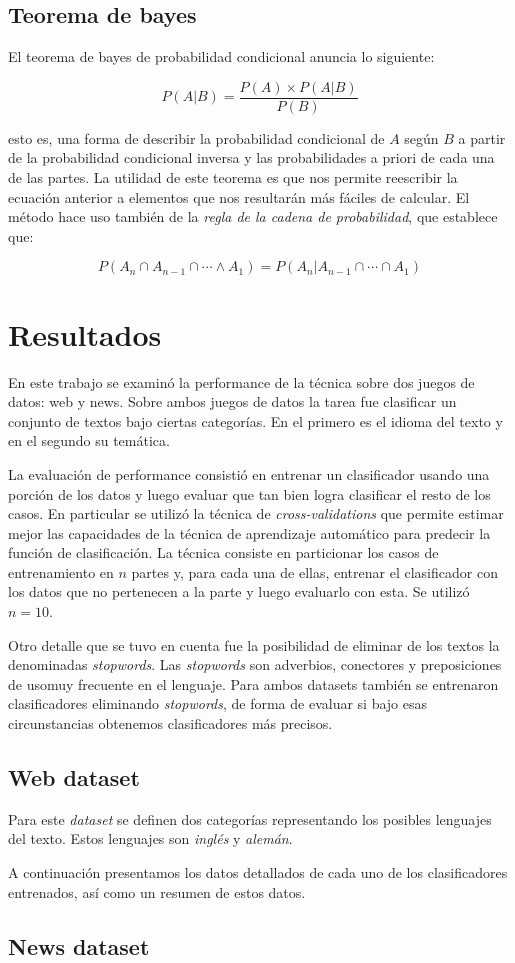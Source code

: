 \documentclass[a4paper,10pt]{article}
\begin{document}
\subsection{Teorema de bayes}

El teorema de bayes de probabilidad condicional anuncia lo siguiente:

$$ P(A | B) = \frac{P(A) \times P(A | B)}{P(B)} $$

esto es, una forma de describir la probabilidad condicional de $A$ según $B$ a partir de la probabilidad condicional inversa y las probabilidades a priori de cada una de las partes. La utilidad de este teorema es que nos permite reescribir la ecuación anterior a elementos que nos resultarán más fáciles de calcular. El método hace uso también de la \emph{regla de la cadena de probabilidad}, que establece que:

$$ P(A_n \cap A_{n-1} \cap \cdots \land A_1) = P(A_n | A_{n-1} \cap \cdots \cap A_1) $$

\section{Resultados}

En este trabajo se examinó la performance de la técnica sobre dos juegos de datos: \textsf{web} y \textsf{news}. Sobre ambos juegos de datos la tarea fue clasificar un conjunto de textos bajo ciertas categorías. En el primero es el idioma del texto y en el segundo su temática. 

La evaluación de performance consistió en entrenar un clasificador usando una porción de los datos y luego evaluar que tan bien logra clasificar el resto de los casos. En particular se utilizó la técnica de \emph{cross-validations} que permite estimar mejor las capacidades de la técnica de aprendizaje automático para predecir la función de clasificación. La técnica consiste en particionar los casos de entrenamiento en $n$ partes y, para cada una de ellas, entrenar el clasificador con los datos que no pertenecen a la parte y luego evaluarlo con esta. Se utilizó $n = 10$.

Otro detalle que se tuvo en cuenta fue la posibilidad de eliminar de los textos la denominadas \emph{stopwords}. Las \emph{stopwords} son adverbios, conectores y preposiciones de usomuy frecuente en el lenguaje. Para ambos datasets también se entrenaron clasificadores eliminando \emph{stopwords}, de forma de evaluar si bajo esas circunstancias obtenemos clasificadores más precisos.

\subsection{\textsf{Web} dataset}

Para este \emph{dataset} se definen dos categorías representando los posibles lenguajes del texto. Estos lenguajes son \emph{inglés} y \emph{alemán}.

A continuación presentamos los datos detallados de cada uno de los clasificadores entrenados, así como un resumen de estos datos.

\subsection{\textsf{News} dataset}
\end{document}
